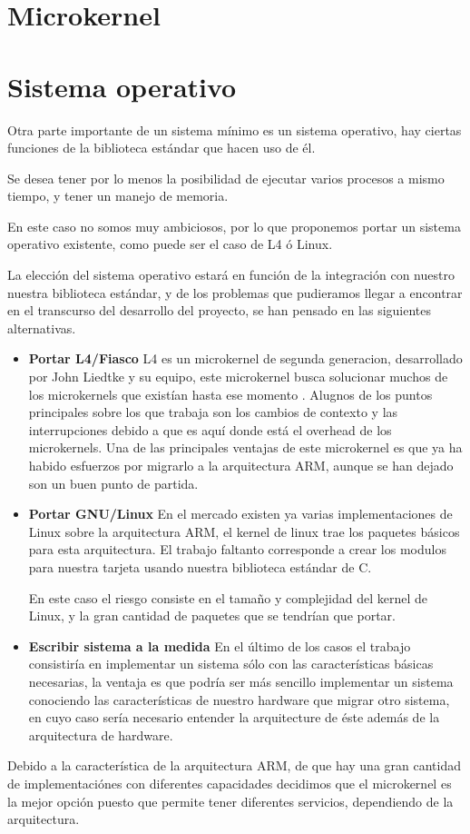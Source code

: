 \section{Microkernel}

\section{Sistema operativo}

Otra parte importante de un sistema m\'inimo es un sistema operativo, hay ciertas funciones de la biblioteca est\'andar que hacen uso de \'el. 

Se desea tener por lo menos la posibilidad de ejecutar varios procesos a mismo tiempo, y tener un manejo de memoria.

En este caso no somos muy ambiciosos, por lo que proponemos portar un sistema operativo existente, como puede ser el caso de L4 \'o Linux. 

La elecci\'on del sistema operativo estar\'a en funci\'on de la integraci\'on con nuestro nuestra biblioteca est\'andar, y de los problemas que pudieramos llegar a encontrar en el transcurso del desarrollo del proyecto, se han pensado en las siguientes alternativas.


\begin{itemize}

\item \textbf{Portar L4/Fiasco} L4 es un microkernel de segunda generacion, desarrollado por John Liedtke y su equipo, este microkernel busca solucionar muchos de los microkernels que exist\'ian hasta ese momento \cite{Liedtke1996}. Alugnos de los puntos principales sobre los que trabaja son los cambios de contexto y las interrupciones debido a que es aqu\'i donde est\'a el overhead de los microkernels. 
Una de las principales ventajas de este microkernel es que ya ha habido esfuerzos por migrarlo a la arquitectura ARM, aunque se han dejado son un buen punto de partida.

\item \textbf{Portar GNU/Linux} En el mercado existen ya varias implementaciones de Linux sobre la arquitectura ARM, el kernel de linux trae los paquetes b\'asicos para esta arquitectura. El trabajo faltanto corresponde a crear los modulos para nuestra tarjeta usando nuestra biblioteca est\'andar de C.

En este caso el riesgo consiste en el tama\~no y complejidad del kernel de Linux, y la gran cantidad de paquetes que se tendr\'ian que portar.

\item \textbf{Escribir sistema a la medida} En el \'ultimo de los casos el trabajo consistir\'ia en implementar un sistema s\'olo con las caracter\'isticas b\'asicas necesarias, la ventaja es que podr\'ia ser m\'as sencillo implementar un sistema conociendo las caracter\'isticas de nuestro hardware que migrar otro sistema, en cuyo caso ser\'ia necesario entender la arquitecture de \'este adem\'as de la arquitectura de hardware.

\end{itemize}

Debido a la caracter\'istica de la arquitectura ARM, de que hay una gran cantidad de implementaci\'ones con diferentes capacidades decidimos que el microkernel es la mejor opci\'on puesto que permite tener diferentes servicios, dependiendo de la arquitectura.

